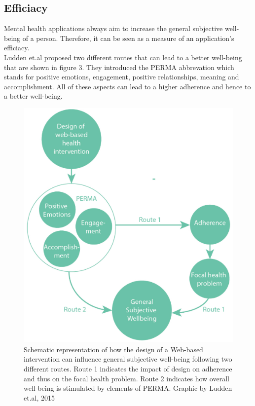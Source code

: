 \documentclass[sigconf, nonacm]{acmart}
\begin{document}
\subsection{Efficiacy}
Mental health applications always aim to increase the general subjective well-being of a person. Therefore, it can be seen as a measure of an application's efficiacy.
\\    
Ludden et.al proposed two different routes that can lead to a better well-being that are shown in figure 3. They introduced the PERMA abbrevation which stands for positive emotions, engagement, positive relationships, meaning and accomplishment. All of these aspects can lead to a higher adherence and hence to a better well-being.\cite{Ludden2015}
\\
\begin{figure}[h]
  \centering
  \includegraphics[width=\linewidth]{routes}
  \caption{Schematic representation of how the design of a Web-based intervention can influence general subjective well-being following two different routes. Route 1 indicates the impact of design on adherence and thus on the focal health problem. Route 2 indicates how overall well-being is stimulated by elements of PERMA. Graphic by Ludden et.al, 2015}
\end{figure}
\end{document}
